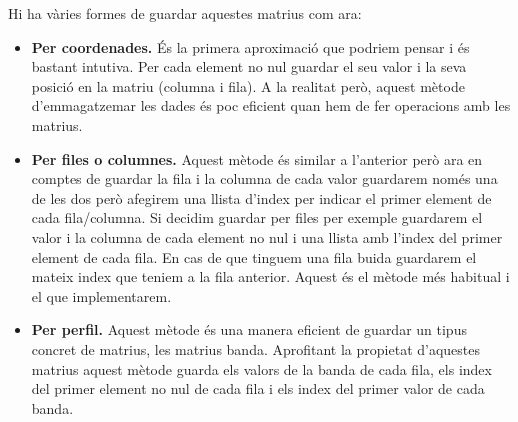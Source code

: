 \documentclass[11pt,a4paper,twoside]{report}
\begin{document}
  Hi ha vàries formes de guardar aquestes matrius com ara:
  \begin{itemize}
    \item \textbf{Per coordenades.} És la primera aproximació que podriem pensar i és bastant intutiva. Per cada element no nul guardar el seu valor i la seva posició en la matriu (columna i fila).
    A la realitat però, aquest mètode d'emmagatzemar les dades és poc eficient quan hem de fer operacions amb les matrius.
    \item \textbf{Per files o columnes.} %
    Aquest mètode és similar a l'anterior però ara en comptes de guardar la fila i la columna de cada valor guardarem només una de les dos però afegirem una llista d'index per indicar el primer element de cada fila/columna. 
    Si decidim guardar per files per exemple guardarem el valor i la columna de cada element no nul i una llista amb l'index del primer element de cada fila.
    En cas de que tinguem una fila buida guardarem el mateix index que teniem a la fila anterior.
    Aquest és el mètode més habitual i el que implementarem.
    \item \textbf{Per perfil.} %
     Aquest mètode és una manera eficient de guardar un tipus concret de matrius, les matrius banda.
    Aprofitant la propietat d'aquestes matrius aquest mètode guarda els valors de la banda de cada fila, els index del primer element no nul de cada fila i els index del primer valor de cada banda.
  \end{itemize}  


  
\end{document}
